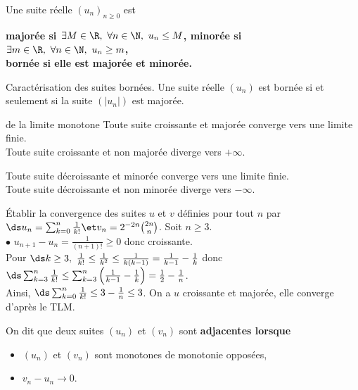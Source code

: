 \documentclass[11pt]{article}
\begin{document}
\begin{defi}{}{}
    Une suite réelle $(u_n)_{n\geq0}$ est
    \begin{center}
        \bf{majorée} si $\exists M\in\R, ~ \forall n \in \N, ~ u_n \leq M$, \qquad \bf{minorée} si $\exists m \in \R, ~ \forall n\in\N, ~ u_n\geq m$,\\
        \bf{bornée} si elle est majorée et minorée.
    \end{center}
\end{defi}

\begin{prop}{Caractérisation des suites bornées.}{}
    Une suite réelle $(u_n)$ est bornée si et seulement si la suite $(|u_n|)$ est majorée.
\end{prop}

\begin{thm}{de la limite monotone}{}
    Toute suite croissante et majorée converge vers une limite finie.\\
    Toute suite croissante et non majorée diverge vers $+\infty$.
\end{thm}

\begin{corr}{}{}
    Toute suite décroissante et minorée converge vers une limite finie.\\
    Toute suite décroissante et non minorée diverge vers $-\infty$.
\end{corr}

\begin{ex}{}{}
    Établir la convergence des suites $u$ et $v$ définies pour tout $n$ par $\ds u_n=\sum_{k=0}^n\frac{1}{k!}\et v_n=2^{-2n}\binom{2n}{n}$.
    \tcblower
    Soit $n\geq3$.\\
    $\bullet$ $u_{n+1}-u_n=\frac{1}{(n+1)!}\geq0$ donc croissante.\\
    Pour $\ds k\geq3,~\frac{1}{k!}\leq\frac{1}{k^2}\leq\frac{1}{k(k-1)}=\frac{1}{k-1}-\frac{1}{k}$ donc $\ds\sum_{k=3}^n\frac{1}{k!}\leq\sum_{k=3}^n\left( \frac{1}{k-1} - \frac{1}{k} \right)=\frac{1}{2}-\frac{1}{n}$.\\
    Ainsi, $\ds\sum_{k=0}^n\frac{1}{k!}\leq 3 - \frac{1}{n} \leq 3$. On a $u$ croissante et majorée, elle converge d'après le TLM.
\end{ex}

\begin{defi}{}{}
    On dit que deux suites $(u_n)$ et $(v_n)$ sont \bf{adjacentes} lorsque
    \begin{itemize}
        \item $(u_n)$ et $(v_n)$ sont monotones de monotonie opposées,
        \item $v_n - u_n \to 0$.
    \end{itemize}
\end{defi}
\end{document}

